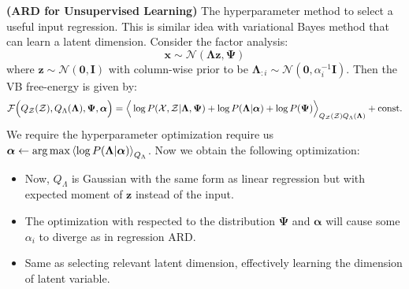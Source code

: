 \begin{remark}{\textbf{(ARD for Unsupervised Learning)}}
    The hyperparameter method to select a useful input regression. This is similar idea with variational Bayes method that can learn a latent dimension. Consider the factor analysis:
    \begin{equation*}
        \boldsymbol x \sim \mathcal{N}(\boldsymbol \Lambda\boldsymbol z, \boldsymbol \Psi)
    \end{equation*}
    where $\boldsymbol z \sim \mathcal{N}(\boldsymbol 0, \boldsymbol I)$ with column-wise prior to be $\boldsymbol \Lambda_{:i}\sim \mathcal{N}(\boldsymbol 0, \alpha_i^{-1}\boldsymbol I)$. Then the VB free-energy is given by:
    \begin{equation*}
        \mathcal{F}\Big( Q_\mathcal{Z}(\mathcal{Z}), Q_\Lambda(\boldsymbol \Lambda), \boldsymbol \Psi, \boldsymbol \alpha \Big) = \Big\langle \log P(\mathcal{X}, \mathcal{Z} | \boldsymbol \Lambda, \boldsymbol \Psi) + \log P(\boldsymbol \Lambda | \boldsymbol \alpha) + \log P(\boldsymbol \Psi) \Big\rangle_{Q_\mathcal{Z}(\mathcal{Z})Q_\Lambda(\boldsymbol \Lambda)} + \text{const.}
    \end{equation*}
    We require the hyperparameter optimization require us $\boldsymbol \alpha \leftarrow \arg\max\left\langle \log P(\boldsymbol \Lambda | \boldsymbol \alpha) \right\rangle_{Q_\Lambda}$. Now we obtain the following optimization:
    \begin{itemize}
        \item Now, $Q_\Lambda$ is Gaussian with the same form as linear regression but with expected moment of $\boldsymbol z$ instead of the input. 
        \item The optimization with respected to the distribution $\boldsymbol \Psi$ and $\boldsymbol \alpha$ will cause some $\alpha_i$ to diverge as in regression ARD. 
        \item Same as selecting relevant latent dimension, effectively learning the dimension of latent variable.
    \end{itemize}
\end{remark}

